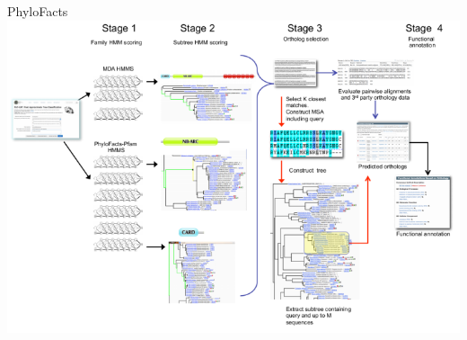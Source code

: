 \documentclass[14pt,xcolor=dvipsnames,pdftex]{beamer}
\begin{document}
\begin{frame}[allowframebreaks]{PhyloFacts}
 \framebreak
 \includegraphics[width=\textwidth]{figures/fatcat-pipeline.png}
\end{frame}
\end{document}
